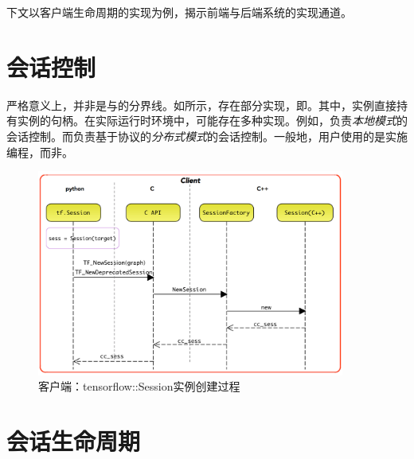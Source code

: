 \begin{content}
下文以客户端生命周期的实现为例，揭示前端与后端\cpp{}系统的实现通道。

\end{content}

\section{会话控制}

\begin{content}

严格意义上，并非是与的分界线。如所示，存在部分\cpp{}实现，即。其中，实例直接持有实例的句柄。在实际运行时环境中，可能存在多种实现。例如，负责\emph{本地模式}的会话控制。而负责基于协议的\emph{分布式模式}的会话控制。一般地，用户使用的是实施编程，而非。

\begin{figure}[!htbp]
\centering
\includegraphics[width=0.9\textwidth]{figures/tf-client-session.png}
\caption{客户端：tensorflow::Session实例创建过程}
 \label{fig:tf-client-session}
\end{figure}

\end{content}

\section{会话生命周期}

